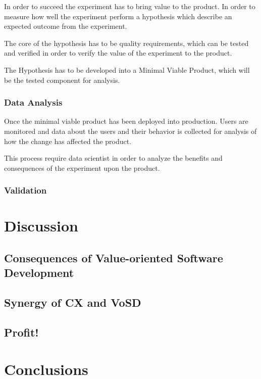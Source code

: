 \documentclass{sig-alternate}
\begin{document}
In order to succeed the experiment has to bring value to the product. In order to measure how well the experiment perform a hypothesis which describe an expected outcome from the experiment.

The core of the hypothesis has to be quality requirements, which can be tested and verified in order to verify the value of the experiment to the product. 

The Hypothesis has to be developed into a Minimal Viable Product, which will be the tested component for analysis.

\subsubsection{Data Analysis}
Once the minimal viable product has been deployed into production. Users are monitored and data about the users and their behavior is collected for analysis of how the change has affected the product. 

This process require data scientist in order to  analyze the benefits and consequences of the experiment upon the product. 

\subsubsection{Validation}


\section{Discussion}

\subsection{Consequences of Value-oriented Software Development}
\subsection{Synergy of CX and VoSD}
\subsection{Profit!}

\section{Conclusions}
\end{document}
